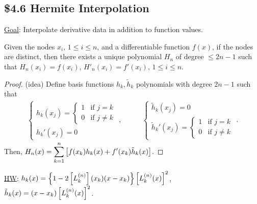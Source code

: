 \documentclass[]{article}
\begin{document}
\subsection*{\$4.6 Hermite Interpolation}

\ul{Goal}: Interpolate derivative data in addition to function values.

\begin{theorem}
	Given the nodes $x_i$, $1\leq i\leq n$, and a differentiable function $f(x)$, if the nodes are distinct, then there exists a unique polynomial $H_n$ of degree $\leq 2n-1$ such that $H_n(x_i) = f(x_i)$, $H'_n(x_i) = f'(x_i)$, $1\leq i\leq n$.
\end{theorem}
\begin{proof}
	(idea) Define basis functions $h_k,\tilde h_k$ polynomials with degree $2n-1$ such that
	\begin{align*}
		\begin{cases} h_k(x_j) = \begin{cases} 1 & \text{if }j=k \\ 0 & \text{if }j\neq k \end{cases} \\ h_k'(x_j) = 0 \end{cases}, &\qquad
		\begin{cases} \tilde h_k(x_j) = 0 \\ \tilde h_k'(x_j) = \begin{cases} 1 & \text{if }j=k \\ 0 & \text{if } j\neq k \end{cases} \end{cases}.
	\end{align*}
	Then, $\displaystyle H_n(x) = \sum_{k=1}^n \left[f(x_k) h_k(x) + f'(x_k)\tilde h_k(x)\right]$.
\end{proof}
\ul{HW}: $h_k(x) = \left\{ 1-2\left[L_k^{(n)}\right](x_k)(x-x_k) \right\}\left[L_k^{(n)}(x)\right]^2$, $\tilde h_k(x) = (x-x_k)\left[L_k^{(n)}(x)\right]^2$.
\end{document}
